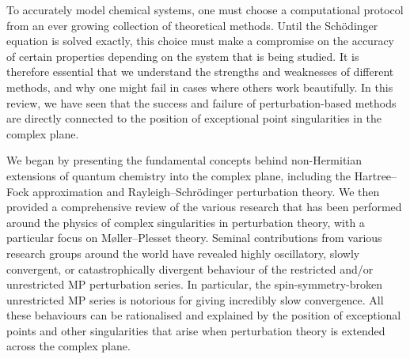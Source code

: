 \documentclass[aps,prb,reprint,noshowkeys,superscriptaddress]{revtex4-1}
\begin{document}
To accurately model chemical systems, one must choose a computational protocol from an ever growing 
collection of theoretical methods.
Until the Sch\"odinger equation is solved exactly, this choice must make a compromise on the accuracy
of certain properties depending on the system that is being studied.
It is therefore essential that we understand the strengths and weaknesses of different methods, 
and why one might fail in cases where others work beautifully.
In this review, we have seen that the success and failure of perturbation-based methods are 
directly connected to the position of exceptional point singularities in the complex plane.

We began by presenting the fundamental concepts behind non-Hermitian extensions of quantum chemistry into the complex plane, 
including the Hartree--Fock approximation and Rayleigh--Schr\"odinger perturbation theory.
We then provided a comprehensive review of the various research that has been performed 
around the physics of complex singularities in perturbation theory, with a particular focus on M{\o}ller--Plesset theory. 
Seminal contributions from various research groups around the world have revealed highly oscillatory,
slowly convergent, or catastrophically divergent behaviour of the restricted and/or unrestricted MP perturbation series.%
\cite{Laidig_1985,Knowles_1985,Handy_1985,Gill_1986,Laidig_1987,Nobes_1987,Gill_1988,Gill_1988a,Lepetit_1988} 
In particular, the spin-symmetry-broken unrestricted MP series is notorious
for giving incredibly slow convergence.\cite{Gill_1986,Nobes_1987,Gill_1988a,Gill_1988}
All these behaviours can be rationalised and explained by the position of exceptional points
and other singularities that arise when perturbation theory is extended across the complex plane.
\end{document}
